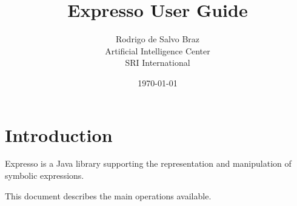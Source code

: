 \documentclass[12pt]{article}
\title{Expresso User Guide}
\author{
        Rodrigo de Salvo Braz \\
        Artificial Intelligence Center\\
        SRI International
}
\date{\today}
\newcommand{\ex}{Expresso\xspace}
\begin{document}
\maketitle

\break

\tableofcontents

\break

\section{Introduction}

\ex is a Java library supporting the representation and manipulation of symbolic expressions.

This document describes the main operations available.




%

\end{document}
